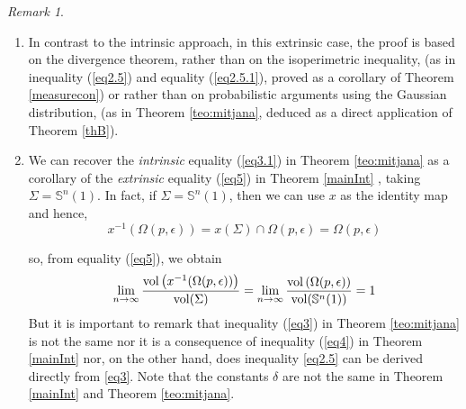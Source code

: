 \documentclass{amsart}
\theoremstyle{definition}
\theoremstyle{remark}
\newtheorem{remark}[theorem]{Remark}
\begin{document}
\begin{remark}\label{remarkone}

\begin{enumerate}

\item In contrast to the intrinsic approach, in this extrinsic case, the proof is based on the divergence theorem, rather than on the isoperimetric inequality, (as in inequality (\ref{eq2.5}) and equality (\ref{eq2.5.1}), proved as a corollary of Theorem \ref{measurecon}) or rather than on probabilistic arguments using the Gaussian distribution, (as in Theorem \ref{teo:mitjana}, deduced as a direct application of Theorem \ref{thB}).
\medskip

\item We can recover the {\em intrinsic} equality  (\ref{eq3.1}) in Theorem \ref{teo:mitjana} as a corollary of the {\em extrinsic} equality (\ref{eq5}) in Theorem \ref{mainInt} , taking $\Sigma=\mathbb{S}^n(1)$. In fact, if $\Sigma=\mathbb{S}^n(1)$, then we can use $x$ as the identity map  and hence, 
$$x^{-1}(\Omega(p,\epsilon))=x(\Sigma) \cap \Omega(p,\epsilon) =\Omega(p,\epsilon)$$

\noindent so, from equality (\ref{eq5}), we obtain
$$
\lim_{n\to\infty}\frac{{\rm vol}\left(x^{-1}(\Omega(p,\epsilon))\right)}{{\rm vol}(\Sigma)}=\lim_{n\to\infty}\frac{{\rm vol}\left(\Omega(p,\epsilon)\right)}{{\rm vol}(\mathbb{S}^n(1))}=1
$$
But it is important to remark that inequality (\ref{eq3}) in Theorem \ref{teo:mitjana} is not the same nor it is  a consequence of inequality (\ref{eq4}) in Theorem \ref{mainInt} nor, on the other hand, does inequality \eqref{eq2.5} can  be derived directly from \eqref{eq3}. Note that the constants $\delta$ are not the same in Theorem \ref{mainInt} and Theorem \ref{teo:mitjana}.
\medskip


\end{enumerate}
\end{remark}
\end{document}
